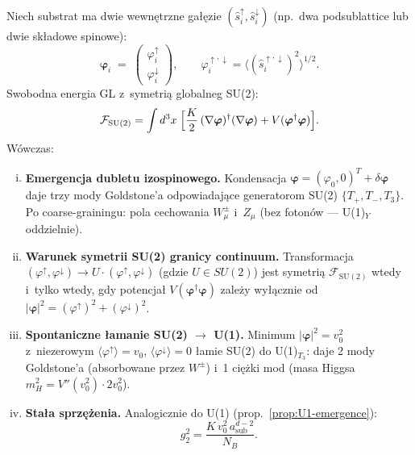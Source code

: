 \begin{proposition}%
\label{prop:SU2-from-substrate}
Niech substrat ma dwie wewn\k{e}trzne ga\l{}\k{e}zie
$(\hat{s}_i^\uparrow, \hat{s}_i^\downarrow)$
(np.\ dwa podsublattice lub dwie sk\l{}adowe spinowe):
\begin{equation}\label{eq:substrate-doublet}
  \boldsymbol{\varphi}_i
  \;=\;
  \begin{pmatrix} \varphi_i^\uparrow \\ \varphi_i^\downarrow \end{pmatrix},
  \qquad
  \varphi_i^{\uparrow,\downarrow} = \langle(\hat{s}_i^{\uparrow,\downarrow})^2\rangle^{1/2}.
\end{equation}
Swobodna energia GL z~symetri\k{a} globalneg SU(2):
\begin{equation}\label{eq:F-SU2}
  \mathcal{F}_{\mathrm{SU(2)}} = \int d^3x\;\Bigl[
    \frac{K}{2}\,(\nabla\boldsymbol{\varphi})^\dagger(\nabla\boldsymbol{\varphi})
    + V(\boldsymbol{\varphi}^\dagger\boldsymbol{\varphi})
  \Bigr].
\end{equation}
W\'owczas:
\begin{enumerate}[(i)]
  \item \textbf{Emergencja dubletu izospinowego.}
    Kondensacja $\boldsymbol{\varphi} = (\varphi_0, 0)^T + \delta\boldsymbol{\varphi}$
    daje trzy mody Goldstone'a odpowiadaj\k{a}ce
    generatorom SU(2) $\{T_+, T_-, T_3\}$.
    Po coarse-grainingu: pola cechowania
    $W_\mu^\pm$ i~$Z_\mu$ (bez foton\'ow --- U(1)$_Y$ oddzielnie).

  \item \textbf{Warunek symetrii SU(2) granicy continuum.}
    Transformacja $({\varphi}^\uparrow, {\varphi}^\downarrow)
    \to U \cdot ({\varphi}^\uparrow, {\varphi}^\downarrow)$
    (gdzie $U \in SU(2)$) jest symetri\k{a}
    $\mathcal{F}_{\mathrm{SU(2)}}$
    wtedy i~tylko wtedy, gdy potencja\l{}
    $V(\boldsymbol{\varphi}^\dagger\boldsymbol{\varphi})$
    zale\.zy wy\l{}\k{a}cznie od $|\boldsymbol{\varphi}|^2
    = (\varphi^\uparrow)^2 + (\varphi^\downarrow)^2$.

  \item \textbf{Spontaniczne \l{}amanie SU(2) $\to$ U(1).}
    Minimum $|\boldsymbol{\varphi}|^2 = v_0^2$ z~niezerowym
    $\langle\varphi^\uparrow\rangle = v_0$, $\langle\varphi^\downarrow\rangle = 0$
    \l{}amie SU(2) do U(1)$_{T_3}$:
    daje 2 mody Goldstone'a (absorbowane przez $W^\pm$)
    i~1 ciężki mod (masa Higgsa~$m_H^2 = V''(v_0^2)\cdot 2v_0^2$).

  \item \textbf{Sta\l{}a sprz\k{e}\.zenia.}
    Analogicznie do U(1) (prop.~\ref{prop:U1-emergence}):
    \begin{equation}\label{eq:g2-from-substrate}
      g_2^2 = \frac{K\,v_0^2\,a_{\mathrm{sub}}^{d-2}}{N_B}.
    \end{equation}
\end{enumerate}
\end{proposition}

